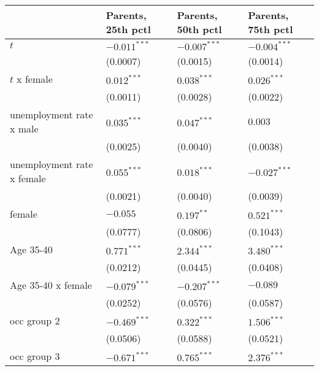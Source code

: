 \begin{tabular}{llll}
\toprule
{} & Parents, 25th pctl & Parents, 50th pctl & Parents, 75th pctl \\
\midrule
$t$                                    &     $-0.011^{***}$ &     $-0.007^{***}$ &     $-0.004^{***}$ \\
                                       &           (0.0007) &           (0.0015) &           (0.0014) \\
$t$ x female                           &      $0.012^{***}$ &      $0.038^{***}$ &      $0.026^{***}$ \\
                                       &           (0.0011) &           (0.0028) &           (0.0022) \\
unemployment rate x male               &      $0.035^{***}$ &      $0.047^{***}$ &            $0.003$ \\
                                       &           (0.0025) &           (0.0040) &           (0.0038) \\
unemployment rate x female             &      $0.055^{***}$ &      $0.018^{***}$ &     $-0.027^{***}$ \\
                                       &           (0.0021) &           (0.0040) &           (0.0039) \\
female                                 &           $-0.055$ &       $0.197^{**}$ &      $0.521^{***}$ \\
                                       &           (0.0777) &           (0.0806) &           (0.1043) \\
Age 35-40                              &      $0.771^{***}$ &      $2.344^{***}$ &      $3.480^{***}$ \\
                                       &           (0.0212) &           (0.0445) &           (0.0408) \\
Age 35-40 x female                     &     $-0.079^{***}$ &     $-0.207^{***}$ &           $-0.089$ \\
                                       &           (0.0252) &           (0.0576) &           (0.0587) \\
occ group 2                            &     $-0.469^{***}$ &      $0.322^{***}$ &      $1.506^{***}$ \\
                                       &           (0.0506) &           (0.0588) &           (0.0521) \\
occ group 3                            &     $-0.671^{***}$ &      $0.765^{***}$ &      $2.376^{***}$ \\

\end{tabular}
